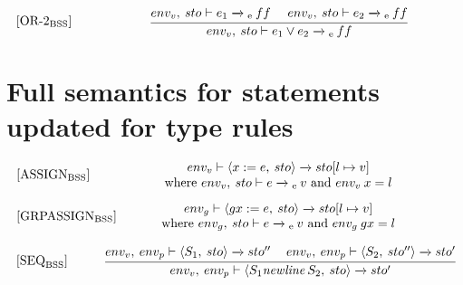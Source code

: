 \begin{equation}
\begin{minipage}{.2\linewidth}
$[\text{OR-2}_\text{BSS}]$
\end{minipage}
\begin{minipage}{.8\linewidth}
\centering
$\cfrac{env_v, \: sto \vdash e_1 \xrightarrow{}\textsubscript{e} \: ff \: \: \: \: \: \: env_v, \: sto \vdash e_2 \xrightarrow{}\textsubscript{e} \: ff}{env_v, \: sto \vdash e_1 \vee e_2 \xrightarrow{}\textsubscript{e} \: ff}$
\end{minipage}
\end{equation}





\section{Full semantics for statements updated for type rules}\label{typerules:AppSec:SemanticsStatements}
\begin{equation}
\begin{minipage}{.2\linewidth}
$[\text{ASSIGN}_\text{BSS}]$
\end{minipage}
\begin{minipage}{.8\linewidth}
\centering
$env_v \vdash \langle x := e, \: sto \rangle \xrightarrow{} sto[l \mapsto v]$
\\
where $env_v, \: sto \vdash e \xrightarrow{}\textsubscript{e} \: v$ and $env_v \: x = l$
\end{minipage}
\end{equation}


\begin{equation}
\begin{minipage}{.2\linewidth}
$[\text{GRPASSIGN}_\text{BSS}]$
\end{minipage}
\begin{minipage}{.8\linewidth}
\centering
$env_g \vdash \langle gx := e, \: sto \rangle \xrightarrow{} sto[l \mapsto v]$
\\
where $env_g, \: sto \vdash e \xrightarrow{}\textsubscript{e} \: v$ and $env_g \: gx = l$
\end{minipage}
\end{equation}


\begin{equation}
\begin{minipage}{.2\linewidth}
$[\text{SEQ}_\text{BSS}]$
\end{minipage}
\begin{minipage}{.8\linewidth}
\centering
$\cfrac{env_v, \: env_p \vdash \langle S_1, \: sto\rangle \xrightarrow{} sto'' \quad\: env_v, \: env_p \vdash \langle S_2, \: sto'' \rangle \xrightarrow{} sto'}{env_v, \: env_p \vdash \langle S_1 \textit{newline} \: S_2, \: sto \rangle \xrightarrow{} sto'}$ 
\end{minipage}
\end{equation}

